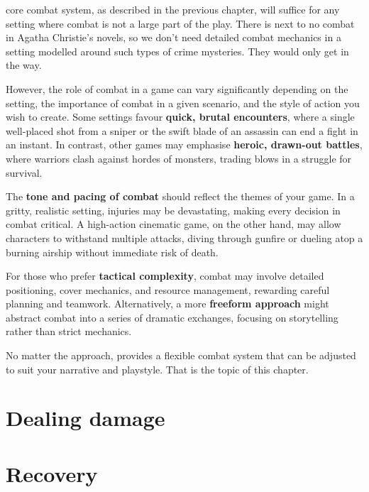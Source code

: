 
 core combat system, as described in the previous chapter, will suffice for any setting where combat is not a large part of the play. There is next to no combat in Agatha Christie's novels, so we don't need detailed combat mechanics in a setting modelled around such types of crime mysteries. They would only get in the way.

However, the role of combat in a game can vary significantly depending on the setting, the importance of combat in a given scenario, and the style of action you wish to create. Some settings favour \textbf{quick, brutal encounters}, where a single well-placed shot from a sniper or the swift blade of an assassin can end a fight in an instant. In contrast, other games may emphasise \textbf{heroic, drawn-out battles}, where warriors clash against hordes of monsters, trading blows in a struggle for survival.

The \textbf{tone and pacing of combat} should reflect the themes of your game. In a gritty, realistic setting, injuries may be devastating, making every decision in combat critical. A high-action cinematic game, on the other hand, may allow characters to withstand multiple attacks, diving through gunfire or dueling atop a burning airship without immediate risk of death.

For those who prefer \textbf{tactical complexity}, combat may involve detailed positioning, cover mechanics, and resource management, rewarding careful planning and teamwork. Alternatively, a more \textbf{freeform approach} might abstract combat into a series of dramatic exchanges, focusing on storytelling rather than strict mechanics.

No matter the approach, \wyrd provides a flexible combat system that can be adjusted to suit your narrative and playstyle. That is the topic of this chapter.


\section{Dealing damage}
\section{Recovery}

